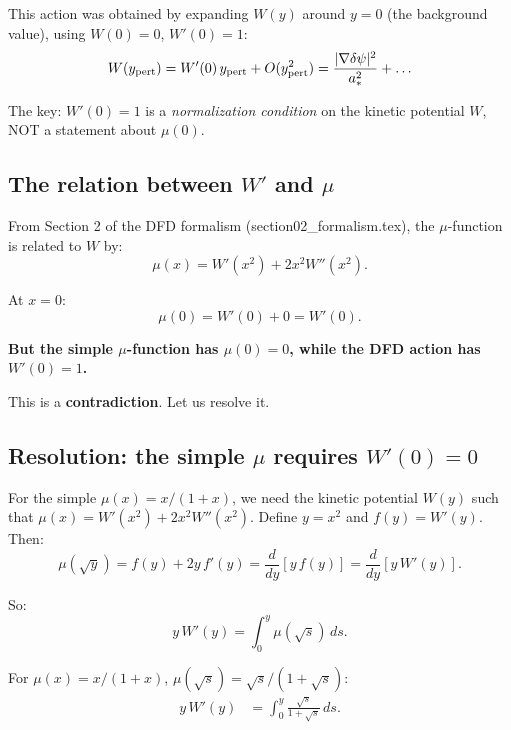 \documentclass[11pt]{article}
\newcommand{\dpsi}{\delta\psi}
\newcommand{\astar}{a_*}
\begin{document}
This action was obtained by expanding $W(y)$ around $y = 0$ (the
background value), using $W(0) = 0$, $W'(0) = 1$:
\begin{equation}
W(y_{\rm pert}) = W'(0)\,y_{\rm pert} + O(y_{\rm pert}^2)
= \frac{|\nabla\dpsi|^2}{\astar^2} + \ldots
\end{equation}

The key: $W'(0) = 1$ is a \emph{normalization condition} on the
kinetic potential $W$, NOT a statement about $\mu(0)$.

\subsection{The relation between $W'$ and $\mu$}

From Section 2 of the DFD formalism (section02\_formalism.tex), the
$\mu$-function is related to $W$ by:
\begin{equation}
\mu(x) = W'(x^2) + 2x^2 W''(x^2).
\label{eq:mu-W-relation}
\end{equation}

At $x = 0$:
\begin{equation}
\mu(0) = W'(0) + 0 = W'(0).
\label{eq:mu0-Wp0}
\end{equation}

\textbf{But the simple $\mu$-function has $\mu(0) = 0$, while the
DFD action has $W'(0) = 1$.}

This is a \textbf{contradiction}. Let us resolve it.

\subsection{Resolution: the simple $\mu$ requires $W'(0) = 0$}

For the simple $\mu(x) = x/(1+x)$, we need the kinetic potential
$W(y)$ such that $\mu(x) = W'(x^2) + 2x^2 W''(x^2)$. Define
$y = x^2$ and $f(y) = W'(y)$. Then:
\begin{equation}
\mu(\sqrt{y}) = f(y) + 2y\,f'(y) = \frac{d}{dy}[y\,f(y)]
= \frac{d}{dy}[y\,W'(y)].
\end{equation}

So:
\begin{equation}
y\,W'(y) = \int_0^y \mu(\sqrt{s})\,ds.
\end{equation}

For $\mu(x) = x/(1+x)$, $\mu(\sqrt{s}) = \sqrt{s}/(1+\sqrt{s})$:
\begin{align}
y\,W'(y) &= \int_0^y \frac{\sqrt{s}}{1+\sqrt{s}}\,ds.
\end{align}
\end{document}
